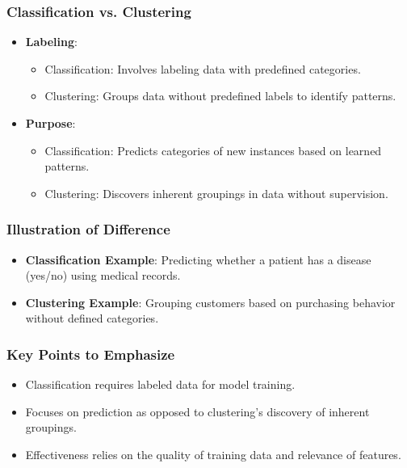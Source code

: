 \documentclass{beamer}
\begin{document}
\begin{frame}[fragile]
    \frametitle{Classification vs. Clustering}
    \begin{itemize}
        \item \textbf{Labeling}:
            \begin{itemize}
                \item Classification: Involves labeling data with predefined categories.
                \item Clustering: Groups data without predefined labels to identify 
                patterns.
            \end{itemize}
        \item \textbf{Purpose}:
            \begin{itemize}
                \item Classification: Predicts categories of new instances based on 
                learned patterns.
                \item Clustering: Discovers inherent groupings in data without 
                supervision.
            \end{itemize}
    \end{itemize}
\end{frame}

\begin{frame}[fragile]
    \frametitle{Illustration of Difference}
    \begin{itemize}
        \item \textbf{Classification Example}: Predicting whether a patient has a 
        disease (yes/no) using medical records.
        \item \textbf{Clustering Example}: Grouping customers based on purchasing 
        behavior without defined categories.
    \end{itemize}
\end{frame}

\begin{frame}[fragile]
    \frametitle{Key Points to Emphasize}
    \begin{itemize}
        \item Classification requires labeled data for model training.
        \item Focuses on prediction as opposed to clustering's discovery of inherent 
        groupings.
        \item Effectiveness relies on the quality of training data and relevance of 
        features.
    \end{itemize}
\end{frame}
\end{document}
